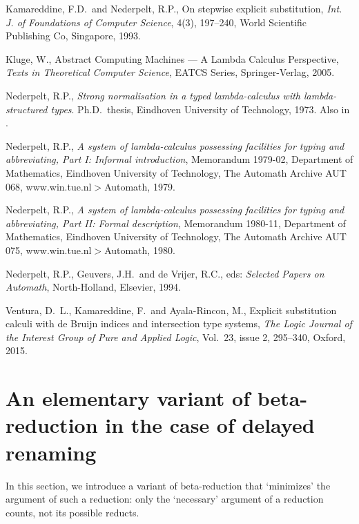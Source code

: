 \documentclass{article}
\theoremstyle{plain}
\theoremstyle{definition}
\begin{document}
{\begin{thebibliography}{8}
Kamareddine, F.D.\ and Nederpelt, R.P.,
On stepwise explicit substitution,
{\em Int. J. of Foundations of Computer Science\/}, 4(3), 197--240, World Scientific Publishing Co, Singapore, 1993.

Kluge, W., {Abstract Computing Machines --- A Lambda Calculus Perspective}, {\em Texts in Theoretical Computer Science\/}, EATCS Series, Springer-Verlag, 2005.

Nederpelt, R.P., {\em Strong normalisation in a typed lambda-calculus with lambda-structured types}. Ph.D.\ thesis, Eindhoven University of Technology, 1973. Also in \cite{NedGeuDeV}.

Nederpelt, R.P., {\em A system of lambda-calculus possessing facilities for typing and abbreviating, Part I: Informal introduction\/},
Memorandum 1979-02, Department of Mathematics, Eindhoven University of Technology,
The Automath Archive AUT 068,
www.win.tue.nl$>$Automath, 1979.
 	
Nederpelt, R.P., {\em A system of lambda-calculus possessing facilities for typing and abbreviating, Part II: Formal description\/},
Memorandum 1980-11, Department of Mathematics, Eindhoven University of Technology,
The Automath Archive AUT 075,
www.win.tue.nl$>$Automath, 1980.

Nederpelt, R.P., Geuvers, J.H.\ and de Vrijer, R.C., eds:
{\em Selected Papers on Automath\/},
North-Holland, Elsevier, 1994.

Ventura, D.\ L., Kamareddine, F.\ and Ayala-Rincon, M., Explicit substitution calculi with de Bruijn indices and intersection type systems, {\em The Logic Journal of the Interest Group of Pure and Applied Logic\/}, Vol.\ 23, issue 2, 295--340, Oxford, 2015.



\end{thebibliography}


\appendix

\section{An elementary variant of beta-reduction in the case of delayed renaming}\label{SecEleVar}%

In this section, we introduce a variant of beta-reduction that `minimizes' the argument of such a reduction: only the `necessary' argument of a reduction counts, not its possible reducts.

}
\end{document}
